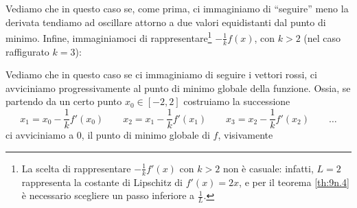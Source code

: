     Vediamo che in questo caso se, come prima, ci immaginiamo di ``seguire'' meno la derivata tendiamo ad oscillare attorno a due valori equidistanti dal punto di minimo. Infine, immaginiamoci di rappresentare\footnote{La scelta di rappresentare $-\frac{1}{k}f'(x)$ con $k>2$ non è casuale: infatti, $L=2$ rappresenta la costante di Lipschitz di $f'(x)=2x$, e per il teorema \ref{th:9n.4} è necessario scegliere un passo inferiore a $\frac{1}{L}$.} $-\frac{1}{k}f(x)$, con $k>2$ (nel caso raffigurato $k=3$):
    \begin{center}
    \end{center}
    Vediamo che in questo caso se ci immaginiamo di seguire i vettori rossi, ci avviciniamo progressivamente al punto di minimo globale della funzione. Ossia, se partendo da un certo punto $x_0\in [-2,2]$ costruiamo la successione
    \[
    x_1 = x_0 - \frac{1}{k}f'(x_0) \qquad x_2 = x_1 - \frac{1}{k}f'(x_1) \qquad x_3 = x_2 - \frac{1}{k}f'(x_2) \qquad \dots
    \]
    ci avviciniamo a $0$, il punto di minimo globale di $f$, visivamente
    \begin{center}
    \end{center}
